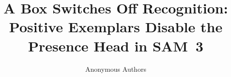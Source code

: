 \documentclass[10pt,twocolumn,letterpaper]{article}
\title{A Box Switches Off Recognition:\\Positive Exemplars Disable the Presence Head in SAM~3}
\author{Anonymous Authors}
\begin{document}
\maketitle










{
    \small
    
    
}
\end{document}
